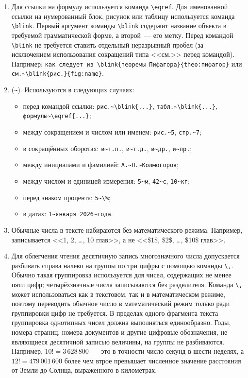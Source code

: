 \begin{enumerate}
    \item {}
        Для ссылки на формулу используется команда \verb|\eqref|.
        Для именованной ссылки на нумерованный блок, рисунок или таблицу используется команда \verb|\blink|.
        Первый аргумент команды \verb|\blink| содержит название объекта в требуемой грамматической форме, а второй~--- его метку.
        Перед командой \verb|\blink| не требуется ставить отдельный неразрывный пробел (за исключением использования сокращений типа <<см.>> перед командой).
        Например: \verb|как следует из \blink{теоремы Пифагора}{theo:пифагор}| или \verb|см.~\blink{рис.}{fig:name}|.

    \item {} (\verb|~|).
        Используются в следующих случаях:
        \begin{itemize}
            \item перед командой ссылки: \verb|рис.~\blink{...}|, \verb|табл.~\blink{...}|,
                \verb|формулы~\eqref{...}|;
            \item между сокращением и числом или именем: \verb|рис.~5|, \verb|стр.~7|;
            \item в сокращённых оборотах: \verb|и~т.п.|, \verb|и~т.д.|,
                \verb|и~др.|, \verb|и~пр.|;
            \item между инициалами и фамилией: \verb|А.~Н.~Колмогоров|;
            \item между числом и единицей измерения: \verb|5~м|, \verb|42~с|, \verb|10~кг|;
            \item перед знаком процента: \verb|5~\%|;
            \item в датах: \verb|1~января 2026~года|.
        \end{itemize}

    \item {}
        Обычные числа в тексте набираются без математического режима.
        Например, записывается <<1, 2, \ldots, 10 глав>>, а не <<\$1\$, \$2\$, \ldots, \$10\$ глав>>.

    \item {}
        Для облегчения чтения десятичную запись многозначного числа допускается разбивать справа налево на группы по три цифры с помощью команды \verb|\,|.
        Обычно такая группировка используется для чисел, содержащих не менее пяти цифр; четырёхзначные числа записываются без разделителя.
        Команда \verb|\,| может использоваться как в текстовом, так и в математическом режиме, поэтому переводить обычное число в математический режим только ради группировки цифр не требуется.
        В пределах одного фрагмента текста группировка однотипных чисел должна выполняться единообразно.
        Годы, номера страниц, номера документов и другие цифровые обозначения, не являющиеся десятичной записью величины, на группы не разбиваются.
        Например, $10! = 3\,628\,800$~--- это в точности число секунд в шести неделях, а $12! = 479\,001\,600$ более чем втрое превышает численное значение расстояния от Земли до Солнца, выраженного в километрах.
    

\end{enumerate}
